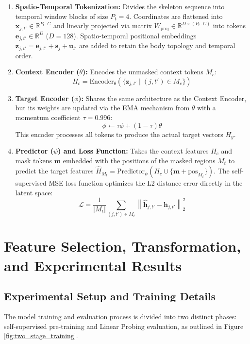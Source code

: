 \documentclass[conference]{IEEEtran}
\begin{document}
\begin{enumerate}
    \item \textbf{Spatio-Temporal Tokenization:} Divides the skeleton sequence into temporal window blocks of size $P_t = 4$. Coordinates are flattened into $\mathbf{x}_{j, t'} \in \mathbb{R}^{P_t \cdot C}$ and linearly projected via matrix $W_{\text{proj}} \in \mathbb{R}^{D \times (P_t \cdot C)}$ into tokens $\mathbf{e}_{j, t'} \in \mathbb{R}^D$ ($D=128$). Spatio-temporal positional embeddings $\mathbf{z}_{j, t'} = \mathbf{e}_{j, t'} + \mathbf{s}_j + \mathbf{u}_{t'}$ are added to retain the body topology and temporal order.
    \item \textbf{Context Encoder ($\theta$):} Encodes the unmasked context tokens $M_c$:
    \begin{equation}
    H_c = \text{Encoder}_{\theta}(\{\mathbf{z}_{j, t'} \mid (j, t') \in M_c\})
    \end{equation}
    \item \textbf{Target Encoder ($\phi$):} Shares the same architecture as the Context Encoder, but its weights are updated via the EMA mechanism from $\theta$ with a momentum coefficient $\tau = 0.996$:
    \begin{equation}
    \phi \leftarrow \tau \phi + (1 - \tau) \theta
    \end{equation}
    This encoder processes all tokens to produce the actual target vectors $H_y$.
    \item \textbf{Predictor ($\psi$) and Loss Function:} Takes the context features $H_c$ and mask tokens $\mathbf{m}$ embedded with the positions of the masked regions $M_t$ to predict the target features $\hat{H}_{M_t} = \text{Predictor}_{\psi}(H_c \cup \{\mathbf{m} + \text{pos}_{M_t}\})$. The self-supervised MSE loss function optimizes the L2 distance error directly in the latent space:
    \begin{equation}
    \label{eq:sjepa_loss}
    \mathcal{L} = \frac{1}{|M_t|} \sum_{(j, t') \in M_t} \left\| \hat{\mathbf{h}}_{j, t'} - \mathbf{h}_{j, t'} \right\|_2^2
    \end{equation}
\end{enumerate}

\section{Feature Selection, Transformation, and Experimental Results}

\subsection{Experimental Setup and Training Details}
The model training and evaluation process is divided into two distinct phases: self-supervised pre-training and Linear Probing evaluation, as outlined in Figure \ref{fig:two_stage_training}.
\end{document}
